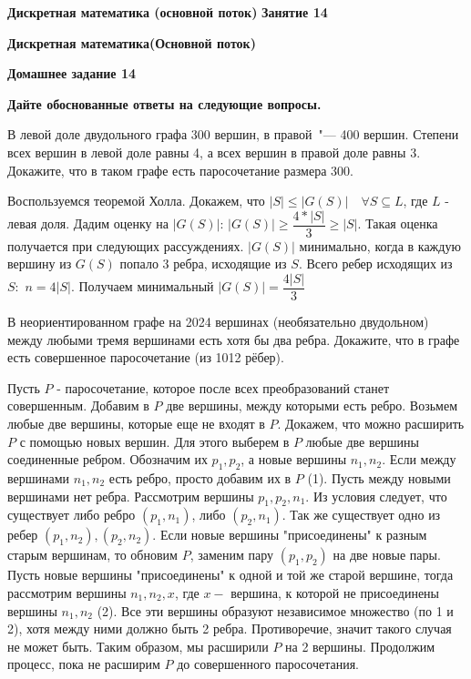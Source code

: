 \documentclass[11pt]{article}
\def\week{14}
\def\theproblem{К\week.\arabic{problem}}
\begin{document}
{\textbf{\large Дискретная математика (основной поток)}\hfill
  \textbf{\large Занятие \week}
}

\setcounter{problem}{0}
\def\theproblem{Д\week.\arabic{problem}}
{\textbf{\large Дискретная математика}\hfill \textbf{(Основной поток)}

\medskip %

\textbf{Домашнее задание \week}}

\medskip

\textbf{Дайте обоснованные ответы на следующие вопросы.}


\vspace{5mm}


\p В левой доле двудольного графа 300 вершин, в правой~"--- 400
вершин. Степени всех вершин в левой доле равны 4, а всех вершин в
правой доле равны 3. Докажите, что в таком графе есть
паросочетание размера 300. 

Воспользуемся теоремой Холла. Докажем, что $|S| \leq |G(S)| \quad \forall S \subseteq L$, где $L$ - левая доля.
Дадим оценку на $|G(S)|$: $|G(S)| \geq \dfrac{4 * |S|}{3} \geq |S|$. 
Такая оценка получается при следующих рассуждениях. $|G(S)|$ минимально, когда в каждую вершину из $G(S)$ попало 3 ребра, исходящие из $S$.
Всего ребер исходящих из $S:$ $n = 4|S|$. Получаем минимальный $|G(S)| = \dfrac{4|S|}{3}$

\p В  неориентированном графе на 2024 вершинах (необязательно двудольном) между любыми тремя вершинами есть хотя бы два ребра. Докажите, что в графе есть совершенное паросочетание (из 1012 рёбер).

Пусть $P$ - паросочетание, которое после всех преобразований станет совершенным. 
Добавим в $P$ две вершины, между которыми есть ребро.
Возьмем любые две вершины, которые еще не входят в $P$. 
Докажем, что можно расширить $P$ с помощью новых вершин. 
Для этого выберем в $P$ любые две вершины соединенные ребром. 
Обозначим их $p_1, p_2$, а новые вершины $n_1, n_2$. 
Если между вершинами $n_1, n_2$ есть ребро, просто добавим их в $P$ (1).
Пусть между новыми вершинами нет ребра.
Рассмотрим вершины $p_1, p_2, n_1$.
Из условия следует, что существует либо ребро $(p_1, n_1)$, либо $(p_2, n_1)$. 
Так же существует одно из ребер $(p_1, n_2), (p_2, n_2)$. 
Если новые вершины "присоединены" к разным старым вершинам, 
то обновим $P$, заменим пару $(p_1, p_2)$ на две новые пары. 
Пусть новые вершины "присоединены" к одной и той же старой вершине, 
тогда рассмотрим вершины $n_1, n_2, x$, где $x -$ вершина, к которой не присоединены вершины $n_1, n_2$ (2). 
Все эти вершины образуют независимое множество (по 1 и 2), хотя между ними должно быть 2 ребра. 
Противоречие, значит такого случая не может быть.
Таким образом, мы расширили $P$ на 2 вершины.
Продолжим процесс, пока не расширим $P$ до совершенного паросочетания.
\end{document}
